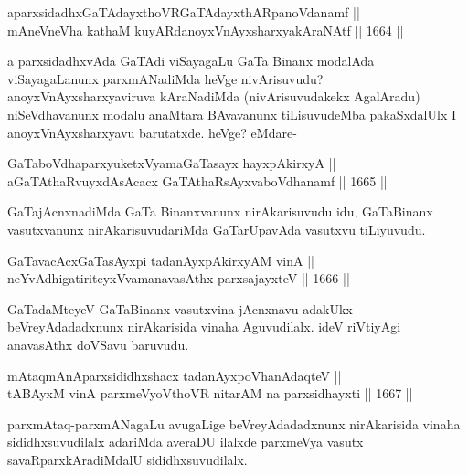 
\begin{shl}
aparxsidadhxGaTAdayxthoVR\s GaTAdayxthARpanoVdanamf || \\
mAneVneVha kathaM kuyARdanoyxVnAyxsharxyakAraNAtf ||  1664 ||  
\end{shl}

\begin{artha}
a parxsidadhxvAda GaTAdi viSayagaLu GaTa Binanx modalAda viSayagaLanunx parxmANadiMda heVge nivArisuvudu? anoyxVnAyxsharxyaviruva kAraNadiMda (nivArisuvudakekx AgalAradu) niSeVdhavanunx modalu anaMtara BAvavanunx tiLisuvudeMba pakaSxdalUlx I anoyxVnAyxsharxyavu barutatxde. heVge? eMdare-
\end{artha}

\begin{shl}
GaTaboVdhaparxyuketxVyamaGaTasayx hayxpAkirxyA ||  \\
aGaTAthaRvuyxdAsAcacx GaTAthaRsAyxvaboVdhanamf  ||  1665 ||  
\end{shl}

\begin{artha}
GaTajAcnxnadiMda GaTa Binanxvanunx nirAkarisuvudu idu, GaTaBinanx vasutxvanunx nirAkarisuvudariMda GaTarUpavAda vasutxvu tiLiyuvudu.
\end{artha}


\begin{shl}
GaTavacAcxGaTasAyxpi tadanAyxpAkirxyAM vinA || \\
neYvAdhigatiriteyxVvamanavasAthx parxsajayxteV ||  1666 || 
\end{shl}

\begin{artha}
GaTadaMteyeV GaTaBinanx vasutxvina jAcnxnavu adakUkx beVreyAdadadxnunx nirAkarisida vinaha Aguvudilalx. ideV riVtiyAgi anavasAthx doVSavu baruvudu.
\end{artha}


\begin{shl}
mAtaqmAnAparxsididhxshacx tadanAyxpoVhanAdaqteV || \\
tABAyxM vinA parxmeVyoV\s thoVR nitarAM na parxsidhayxti ||  1667 ||  
\end{shl}

\begin{artha}
parxmAtaq-parxmANagaLu avugaLige beVreyAdadadxnunx nirAkarisida vinaha sididhxsuvudilalx adariMda averaDU ilalxde parxmeVya vasutx savaRparxkAradiMdalU sididhxsuvudilalx.
\end{artha}

